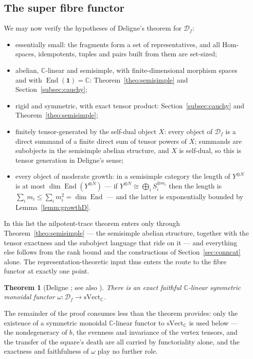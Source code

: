 \documentclass[11pt]{article}
\newtheorem{theo}{Theorem}[section]
\newcommand{\cauchy}{\mathcal{D}_{f}}             %
\newcommand{\unitobj}{\mathbf{1}}                 %
\newcommand{\genX}{X}                             %
\newcommand{\End}{\operatorname{End}}
\newcommand{\fib}{\omega}                         %
\newcommand{\svect}{\mathrm{sVect}_{\mathbb{C}}}
\begin{document}
\subsection{The super fibre functor}\label{subsec:fibrefunctor}

We may now verify the hypotheses of Deligne's theorem for
$\cauchy$:
\begin{itemize}
\item essentially small: the fragments form a set of
  representatives, and all Hom-spaces, idempotents, tuples and
  pairs built from them are set-sized;
\item abelian, $\mathbb{C}$-linear and semisimple, with
  finite-dimensional morphism spaces and with
  $\End(\unitobj)=\mathbb{C}$: Theorem~\ref{theo:semisimple} and
  Section~\ref{subsec:cauchy};
\item rigid and symmetric, with exact tensor product:
  Section~\ref{subsec:cauchy} and
  Theorem~\ref{theo:semisimple};
\item finitely tensor-generated by the self-dual object $\genX$:
  every object of $\cauchy$ is a direct summand of a finite
  direct sum of tensor powers of $\genX$; summands are subobjects
  in the semisimple abelian structure, and $\genX$ is self-dual,
  so this is tensor generation in Deligne's sense;
\item every object of moderate growth: in a semisimple category
  the length of $Y^{\otimes N}$ is at most
  $\dim\End(Y^{\otimes N})$ --- if
  $Y^{\otimes N}\cong\bigoplus_{i}S_{i}^{\oplus m_{i}}$ then the
  length is $\sum_{i}m_{i}\le\sum_{i}m_{i}^{2}=\dim\End$ --- and
  the latter is exponentially bounded by
  Lemma~\ref{lemm:growthD}.
\end{itemize}
In this list the
nilpotent-trace theorem enters only through
Theorem~\ref{theo:semisimple} --- the semisimple abelian
structure, together with the tensor exactness and the subobject
language that ride on it --- and everything else follows from
the rank bound and the constructions of
Section~\ref{sec:conncat} alone. The representation-theoretic
input thus enters the route to the fibre functor at exactly one
point.

\begin{theo}[{Deligne \cite[Thm~0.6]{Del02}; see also
\cite{Ost04}}]\label{theo:fibre}
There is an exact faithful $\mathbb{C}$-linear symmetric monoidal
functor $\fib\colon\cauchy\to\svect$.
\end{theo}

The remainder of the proof consumes less than the theorem
provides: only the existence of a symmetric monoidal
$\mathbb{C}$-linear functor to $\svect$ is used below --- the
nondegeneracy of $b$, the evenness and invariance of the vertex
tensors, and the transfer of the square's death are all carried
by functoriality alone, and the exactness and faithfulness of
$\fib$ play no further role.
\end{document}
